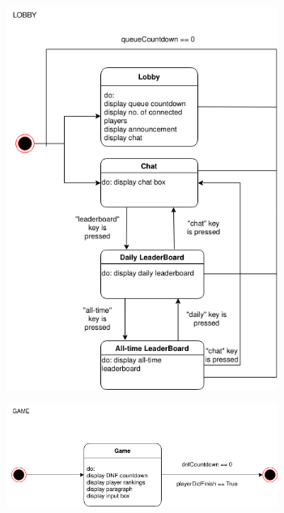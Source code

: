 \documentclass[titlepage]{article}
\begin{document}
\begin{figure}[ht]
	\centering
	\includegraphics[width=0.79\textwidth]{state_diagram_lobby.png}
\end{figure}

\begin{figure}[ht]
	\centering
	\includegraphics[width=0.79\textwidth]{state_diagram_game.png}
\end{figure}
\end{document}
